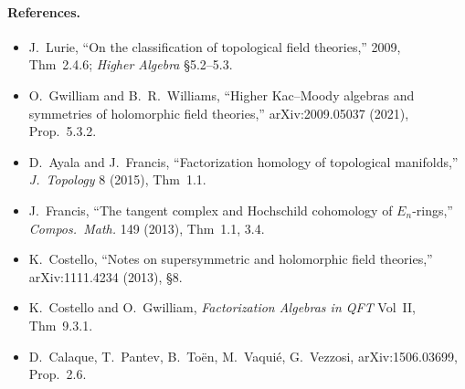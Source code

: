 \paragraph{References.}
\begin{itemize}
  \item J.\ Lurie, ``On the classification of topological field
    theories,'' 2009, Thm~2.4.6; \emph{Higher Algebra} \S5.2--5.3.
  \item O.\ Gwilliam and B.\ R.\ Williams, ``Higher Kac--Moody
    algebras and symmetries of holomorphic field theories,''
    arXiv:2009.05037 (2021), Prop.~5.3.2.
  \item D.\ Ayala and J.\ Francis, ``Factorization homology of
    topological manifolds,'' \emph{J.\ Topology} 8 (2015), Thm~1.1.
  \item J.\ Francis, ``The tangent complex and Hochschild cohomology
    of $E_n$-rings,'' \emph{Compos.\ Math.} 149 (2013), Thm~1.1, 3.4.
  \item K.\ Costello, ``Notes on supersymmetric and holomorphic field
    theories,'' arXiv:1111.4234 (2013), \S8.
  \item K.\ Costello and O.\ Gwilliam, \emph{Factorization Algebras
    in QFT} Vol~II, Thm~9.3.1.
  \item D.\ Calaque, T.\ Pantev, B.\ Toën, M.\ Vaqui\'e, G.\ Vezzosi,
    arXiv:1506.03699, Prop.~2.6.
\end{itemize}
